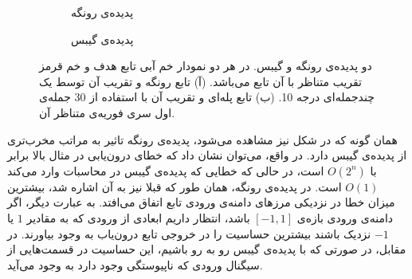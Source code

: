 \documentclass[12pt,onecolumn,a4paper]{article}
\begin{document}
 \begin{figure}
    \centering
    \begin{subfigure}[b]{0.45\textwidth}
        \centering
        \caption{پدیده‌ی رونگه}
        \label{fig:runge}
    \end{subfigure}
    \hfill
    \begin{subfigure}[b]{0.45\textwidth}
        \centering
        \caption{پدیده‌ی گیبس}
        \label{fig:gibbs}
    \end{subfigure}
       \caption{دو پدیده‌ی رونگه و گیبس. در هر دو نمودار خم آبی تابع هدف و خم قرمز تقریب متناظر با آن تابع می‌باشد. (آ) تابع رونگه و تقریب آن توسط یک چندجمله‌ای درجه 10. (ب) تابع پله‌ای و تقریب آن با استفاده از 30 جمله‌ی اول سری فوریه‌ی متناظر آن.}
       \label{fig:runge_gibbs}
\end{figure}

همان گونه که در شکل نیز مشاهده می‌شود، پدیده‌ی رونگه تاثیر به مراتب مخرب‌تری از پدیده‌ی گیبس دارد. در واقع، می‌توان نشان داد که خطای درون‌یابی  در مثال بالا برابر با 
$O(2^n‌)$ 
است، در حالی که خطایی که پدیده‌ی گیبس در محاسبات وارد می‌کند 
$O(1)$ 
است. در پدیده‌ی رونگه، همان طور که قبلا نیز به آن اشاره شد، بیشترین میزان خطا در نزدیکی مرزهای دامنه‌ی ورودی تابع اتفاق می‌افتد. به عبارت دیگر، اگر دامنه‌ی ورودی بازه‌ی 
$[-1,1]$ 
باشد، انتظار داریم ابعادی از ورودی که به مقادیر $1$ یا $-1$ نزدیک باشند بیشترین حساسیت را در خروجی تابع درون‌یاب به وجود بیاورند. در مقابل، در صورتی که با پدیده‌ی گیبس رو به رو باشیم، این حساسیت در قسمت‌هایی از سیگنال ورودی که ناپیوستگی وجود دارد به وجود می‌آید.
\end{document}
